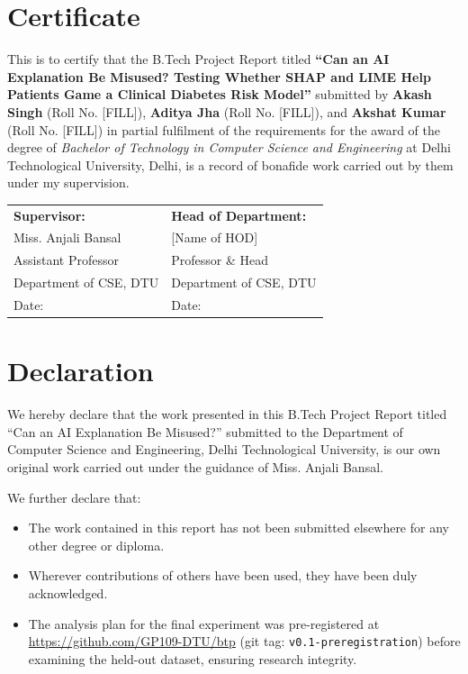 \documentclass[12pt, a4paper, oneside]{report}
\theoremstyle{definition}
\begin{document}
\chapter*{Certificate}

This is to certify that the B.Tech Project Report titled
\textbf{``Can an AI Explanation Be Misused? Testing Whether SHAP and LIME
Help Patients Game a Clinical Diabetes Risk Model''} submitted by
\textbf{Akash Singh} (Roll No. [FILL]),
\textbf{Aditya Jha} (Roll No. [FILL]), and
\textbf{Akshat Kumar} (Roll No. [FILL])
in partial fulfilment of the requirements for the award of the degree of
\emph{Bachelor of Technology in Computer Science and Engineering}
at Delhi Technological University, Delhi, is a record of bonafide work
carried out by them under my supervision.

\vspace{2cm}

\noindent
\begin{tabular}{p{7cm}p{7cm}}
  \textbf{Supervisor:}                   & \textbf{Head of Department:} \\[1.5cm]
  Miss. Anjali Bansal                    & [Name of HOD] \\
  Assistant Professor                    & Professor \& Head \\
  Department of CSE, DTU                 & Department of CSE, DTU \\
  Date: \underline{\hspace{3cm}}         & Date: \underline{\hspace{3cm}} \\
\end{tabular}

\chapter*{Declaration}

We hereby declare that the work presented in this B.Tech Project Report
titled ``Can an AI Explanation Be Misused?'' submitted to the Department
of Computer Science and Engineering, Delhi Technological University,
is our own original work carried out under the guidance of Miss. Anjali Bansal.

We further declare that:
\begin{itemize}
  \item The work contained in this report has not been submitted elsewhere
        for any other degree or diploma.
  \item Wherever contributions of others have been used, they have been
        duly acknowledged.
  \item The analysis plan for the final experiment was pre-registered at
        \url{https://github.com/GP109-DTU/btp} (git tag: \texttt{v0.1-preregistration})
        before examining the held-out dataset, ensuring research integrity.
\end{itemize}
\end{document}
